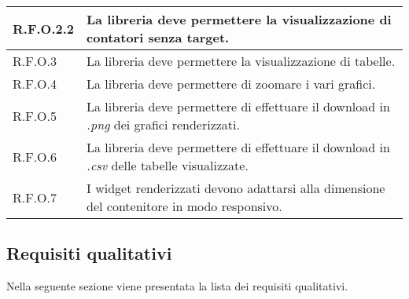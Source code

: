 \begin{center}
\begin{longtable}{|p{2.5cm}|p{10cm}|}
        \hline
        R.F.O.2.2          & La libreria deve permettere la visualizzazione di contatori senza target.                          \\
        \hline
        R.F.O.3            & La libreria deve permettere la visualizzazione di tabelle.                                         \\
        \hline
        R.F.O.4            & La libreria deve permettere di zoomare i vari grafici.                                             \\
        \hline
        R.F.O.5            & La libreria deve permettere di effettuare il download in \textit{.png} dei grafici renderizzati.   \\
        \hline
        R.F.O.6            & La libreria deve permettere di effettuare il download in \textit{.csv} delle tabelle visualizzate. \\
        \hline
        R.F.O.7            & I widget renderizzati devono adattarsi alla dimensione del contenitore in modo responsivo.         \\
    \end{longtable}
    \label{tab:requisiti_funzionali}
\end{center}

\subsection{Requisiti qualitativi}
Nella seguente sezione viene presentata la lista dei requisiti qualitativi. \newline

